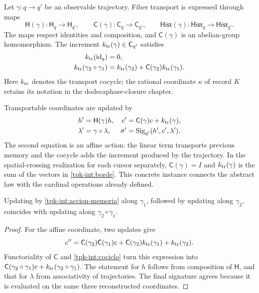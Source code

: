 Let \(\gamma:q\to q'\) be an observable trajectory. Fiber transport
is expressed through maps
\[
 \mathsf H(\gamma):\mathsf H_q\to\mathsf H_{q'},\qquad
 \mathsf C(\gamma):\mathsf C_q\to\mathsf C_{q'},\qquad
 \mathsf{Hist}(\gamma):\mathsf{Hist}_q\to\mathsf{Hist}_{q'}.
\]
The maps respect identities and composition, and
\(\mathsf C(\gamma)\) is an abelian-group homomorphism.
The increment \(k_{\rm tr}(\gamma)\in\mathsf C_{q'}\) satisfies
\begin{equation}
 \begin{split}
 k_{\rm tr}(\operatorname{id}_q)&=0,\\
 k_{\rm tr}(\gamma_2\circ\gamma_1)
 &=k_{\rm tr}(\gamma_2)+
   \mathsf C(\gamma_2)k_{\rm tr}(\gamma_1).
 \end{split}
 \label{tpk-int:cociclo}
\end{equation}
Here \(k_{\rm tr}\) denotes the transport cocycle;
the rational coordinate \(\kappa\) of record \(K\) retains
its notation in the dodecaphase-closure chapter.

Transportable coordinates are updated by
\begin{equation}
 \begin{aligned}
 h'&=\mathsf H(\gamma)h,&
 c'&=\mathsf C(\gamma)c+k_{\rm tr}(\gamma),\\
 \lambda'&=\gamma\circ\lambda,&
 \sigma'&=\operatorname{Sig}_{q'}(h',c',\lambda').
 \end{aligned}
 \label{tpk-int:accion-memoria}
\end{equation}
The second equation is an affine action: the linear term transports
previous memory and the cocycle adds the increment produced by the
trajectory. In the spatial-crossing realization for each cursor separately,
\(\mathsf C(\gamma)=I\) and \(k_{\rm tr}(\gamma)\) is the sum
of the vectors in \eqref{tpk-int:borde}. This concrete instance connects
the abstract law with the cardinal operations already defined.

\begin{proposition}
\label{tpk-int:composicion-memoria}
Updating by \eqref{tpk-int:accion-memoria} along
\(\gamma_1\), followed by updating along \(\gamma_2\),
coincides with updating along \(\gamma_2\circ\gamma_1\).
\end{proposition}
\begin{proof}
For the affine coordinate, two updates give
\[
 c''=\mathsf C(\gamma_2)\mathsf C(\gamma_1)c
       +\mathsf C(\gamma_2)k_{\rm tr}(\gamma_1)
       +k_{\rm tr}(\gamma_2).
\]
Functoriality of \(\mathsf C\) and
\eqref{tpk-int:cociclo} turn this expression into
\(\mathsf C(\gamma_2\circ\gamma_1)c+
k_{\rm tr}(\gamma_2\circ\gamma_1)\).
The statement for \(h\) follows from composition of
\(\mathsf H\), and that for \(\lambda\) from associativity
of trajectories. The final signature agrees because it is evaluated
on the same three reconstructed coordinates.
\end{proof}

